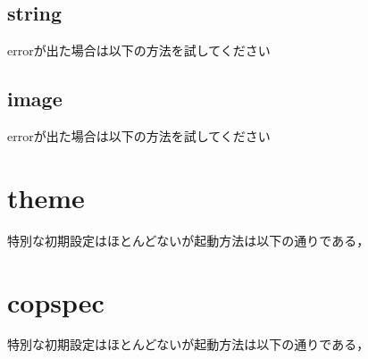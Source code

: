 \subsection{string}\label{string}
errorが出た場合は以下の方法を試してください

\subsection{image}\label{image}
errorが出た場合は以下の方法を試してください

\section{theme}\label{theme}
特別な初期設定はほとんどないが起動方法は以下の通りである，

\section{copspec}\label{copspec}
特別な初期設定はほとんどないが起動方法は以下の通りである，
